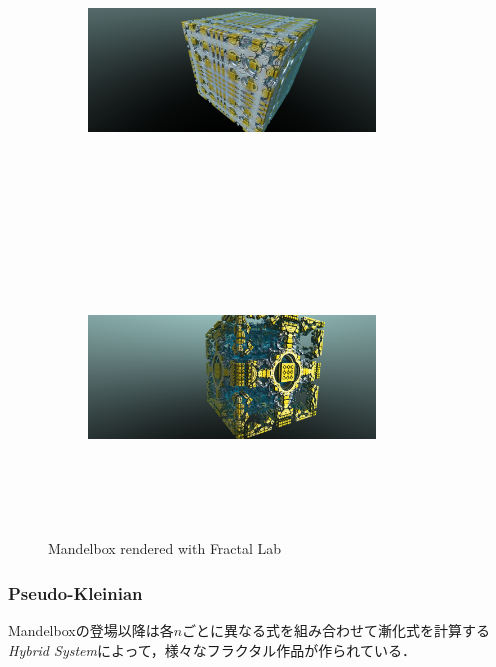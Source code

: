 \begin{figure}[h!tbp]
 \begin{subfigure}{0.49\hsize}
  \center
  \includegraphics[width=3in, height=3in, keepaspectratio]{../img/fractal/mandelbox.pdf}
  \caption{}
  \label{fig:mandelbox1}
 \end{subfigure}
 \hspace*{\fill}
 \begin{subfigure}{0.49\hsize}
  \center
  \includegraphics[width=3in, height=3in, keepaspectratio]{../img/fractal/mandelbox2.pdf}
  \caption{}
  \label{fig:mandelbox2}
 \end{subfigure}
 \caption{Mandelbox rendered with Fractal Lab}
 \label{fig:mandelbox}
\end{figure}


\subsubsection{Pseudo-Kleinian}

Mandelboxの登場以降は各$n$ごとに異なる式を組み合わせて漸化式を計算する
\textit{Hybrid System}によって，様々なフラクタル作品が作られている．

